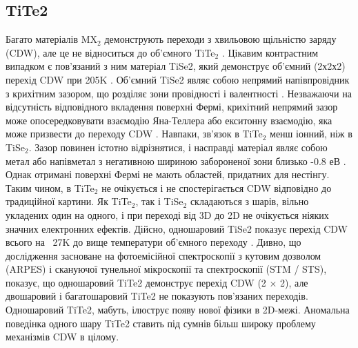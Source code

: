 \subsection{TiTe2}
Багато матеріалів MX$_2$ демонструють переходи з хвильовою щільністю заряду (CDW), але це не відноситься до об'ємного TiTe$_2$ \cite{TiTe2_1,TiTe2_2, TiTe2_3, TiTe2_4}. Цікавим контрастним випадком є пов'язаний з ним матеріал TiSe2, який демонструє об'ємний (2х2х2) перехід CDW при 205K \cite{TiTe2_5}. Об'ємний TiSe2 являє собою непрямий напівпровідник з крихітним зазором, що розділяє зони провідності і валентності \cite{TiTe2_6}. Незважаючи на відсутність відповідного вкладення поверхні Фермі, крихітний непрямий зазор може опосередковувати взаємодію Яна-Теллера або екситонну взаємодію, яка може призвести до переходу CDW \cite{TiTe2_6}. Навпаки, зв'язок в TiTe$_2$ менш іонний, ніж в TiSe$_2$. Зазор повинен істотно відрізнятися, і насправді матеріал являє собою метал або напівметал з негативною шириною забороненої зони близько -0.8 $еВ$ \cite{TiTe2_1}. Однак отримані поверхні Фермі не мають областей, придатних для нестінгу. Таким чином, в TiTe$_2$ не очікується і не спостерігається CDW відповідно до традиційної картини. Як TiTe$_2$, так і TiSe$_2$ складаються з шарів, вільно укладених один на одного, і при переході від 3D до 2D не очікується ніяких значних електронних ефектів. Дійсно, одношаровий TiSe2 показує перехід CDW всього на ~27K до вище температури об'ємного переходу \cite{TiTe2_7}.
Дивно, що дослідження засноване на фотоемісійної спектроскопії з кутовим дозволом (ARPES) і скануючої тунельної мікроскопії та спектроскопії (STM / STS), показує, що одношаровий TiTe2 демонструє перехід CDW (2 × 2), але двошаровий і багатошаровий TiTe2 не показують пов'язаних переходів. Одношаровий TiTe2, мабуть, ілюструє появу нової фізики в 2D-межі. Аномальна поведінка одного шару TiTe2 ставить під сумнів більш широку проблему механізмів CDW в цілому.
